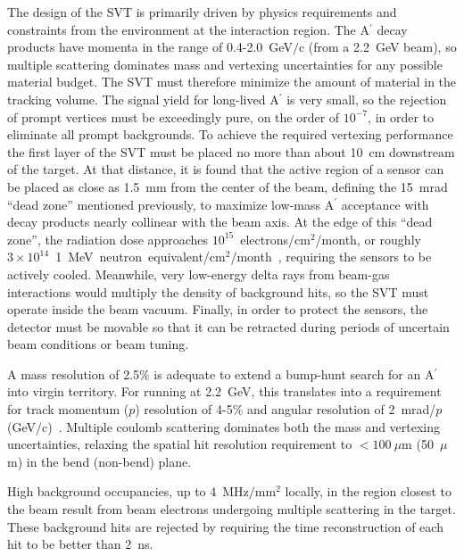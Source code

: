 \documentclass[final,3p,times,twocolumn]{elsarticle}
\newcommand{\Aprime}{A\ensuremath{^\prime}}
\newcommand{\fluenceunit}{1~MeV~neutron~equivalent/cm\ensuremath{^2}}
\begin{document}
The design of the SVT is primarily driven by physics requirements and constraints from the 
environment at the interaction region. 
The \Aprime{} decay products have momenta in the range of 0.4-2.0~GeV$/$c (from a 2.2~GeV beam), so 
multiple scattering 
dominates mass and vertexing uncertainties for any possible material budget. The SVT must therefore 
minimize the amount of material in the tracking volume. 
The signal yield for long-lived \Aprime{} is very small, so 
the rejection of prompt vertices must be exceedingly pure, on the order of $10^{-7}$, in order to 
eliminate all prompt backgrounds. To achieve the required vertexing performance the first layer of the 
SVT must be placed no more than about 10~cm downstream of the target. At that distance, it is found 
that the active region of a sensor can be placed as close as 1.5~mm from the center of the beam, 
defining the 15~mrad ``dead zone'' mentioned previously, to maximize low-mass \Aprime{} acceptance 
with decay products nearly collinear with the beam axis. At the edge of this ``dead zone'', the 
radiation dose approaches $10^{15}$~electrons/cm$^2$/month, or roughly 
$3 \times 10^{14}$~\fluenceunit{}/month~\cite{Rashevskaya:2002nd}, 
requiring the sensors to be actively cooled. 
Meanwhile, very low-energy delta rays from 
beam-gas interactions would multiply the density of background hits, so the SVT must operate inside the 
beam vacuum.  Finally, in order to protect the sensors, the detector must be movable so that it can be 
retracted during periods of uncertain beam conditions or beam tuning.  

A mass resolution of 2.5\% is adequate to extend a bump-hunt search for an \Aprime{} into virgin territory. 
For running at 2.2~GeV, this translates into a requirement for track momentum ($p$) resolution of 4-5\% and 
angular resolution of 2~mrad/$p$(GeV/c)~\cite{HPS_proposal_2010}. 
Multiple coulomb scattering dominates both the mass and vertexing uncertainties, relaxing 
the spatial hit resolution requirement to $<100~\mu$m (50~$\mu$m) in the bend (non-bend) plane.

High background occupancies, up to 4~MHz$/$mm$^{2}$ locally,  in the region closest to the beam result 
from beam electrons undergoing multiple scattering in the target. These background hits are rejected by  
requiring the time reconstruction of each hit to be better than 2~ns. 
\end{document}
